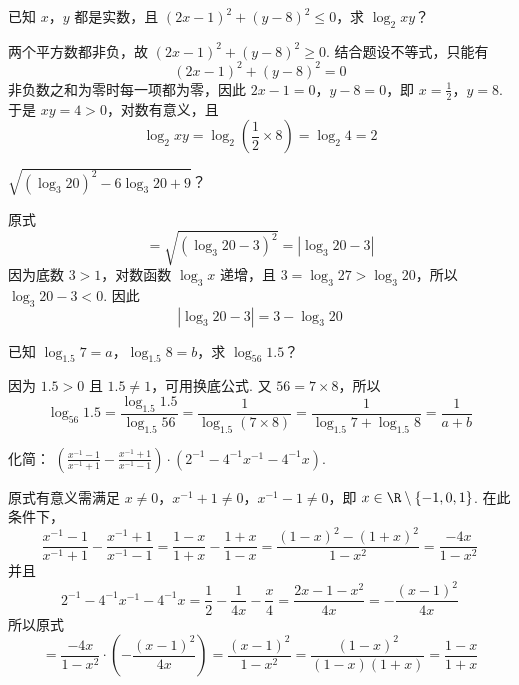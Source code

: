 \begin{problem}
已知 \(x\)，\(y\) 都是实数，且 \(\left(2x-1\right)^2+\left(y-8\right)^2\leq 0\)，求 \(\log_2xy\)？
\end{problem}

\begin{solution}
两个平方数都非负，故
\(\left(2x-1\right)^2+\left(y-8\right)^2\geq 0\). 结合题设不等式，只能有
\[
\left(2x-1\right)^2+\left(y-8\right)^2=0
\]
非负数之和为零时每一项都为零，因此
\(2x-1=0\)，\(y-8=0\)，即 \(x=\frac{1}{2}\)，\(y=8\). 于是 \(xy=4>0\)，对数有意义，且
\[
\log_2xy=\log_2\left(\frac{1}{2}\times 8\right)=\log_2 4=2
\]
\end{solution}

\begin{problem}
\(\sqrt{\left(\log_3 20\right)^2-6\log_3 20+9}\)？
\end{problem}

\begin{solution}
原式
\[
=\sqrt{\left(\log_3 20-3\right)^2}=\left\lvert\log_3 20-3\right\rvert
\]
因为底数 \(3>1\)，对数函数 \(\log_3x\) 递增，且
\(3=\log_3 27>\log_3 20\)，所以 \(\log_3 20-3<0\). 因此
\[
\left\lvert\log_3 20-3\right\rvert=3-\log_3 20
\]
\end{solution}

\begin{problem}
已知 \(\log_{1.5}7=a\)，\(\log_{1.5}8=b\)，求 \(\log_{56}1.5\)？
\end{problem}

\begin{solution}
因为 \(1.5>0\) 且 \(1.5\neq 1\)，可用换底公式. 又 \(56=7\times 8\)，所以
\[
\log_{56}1.5=\frac{\log_{1.5}1.5}{\log_{1.5}56}=\frac{1}{\log_{1.5}(7\times 8)}=\frac{1}{\log_{1.5}7+\log_{1.5}8}=\frac{1}{a+b}
\]
\end{solution}

\begin{problem}
化简：
\(\left(\frac{x^{-1}-1}{x^{-1}+1}-\frac{x^{-1}+1}{x^{-1}-1}\right)\cdot\left(2^{-1}-4^{-1}x^{-1}-4^{-1}x\right)\).
\end{problem}

\begin{solution}
原式有意义需满足 \(x\neq 0\)，\(x^{-1}+1\neq 0\)，\(x^{-1}-1\neq 0\)，即
\(x\in\R\mathbin{\backslash}\{-1,0,1\}\). 在此条件下，
\[
\frac{x^{-1}-1}{x^{-1}+1}-\frac{x^{-1}+1}{x^{-1}-1}
=\frac{1-x}{1+x}-\frac{1+x}{1-x}
=\frac{(1-x)^2-(1+x)^2}{1-x^2}
=\frac{-4x}{1-x^2}
\]
并且
\[
2^{-1}-4^{-1}x^{-1}-4^{-1}x
=\frac{1}{2}-\frac{1}{4x}-\frac{x}{4}
=\frac{2x-1-x^2}{4x}
=-\frac{(x-1)^2}{4x}
\]
所以原式
\[
=\frac{-4x}{1-x^2}\cdot\left(-\frac{(x-1)^2}{4x}\right)
=\frac{(x-1)^2}{1-x^2}
=\frac{(1-x)^2}{(1-x)(1+x)}
=\frac{1-x}{1+x}
\]
\end{solution}

